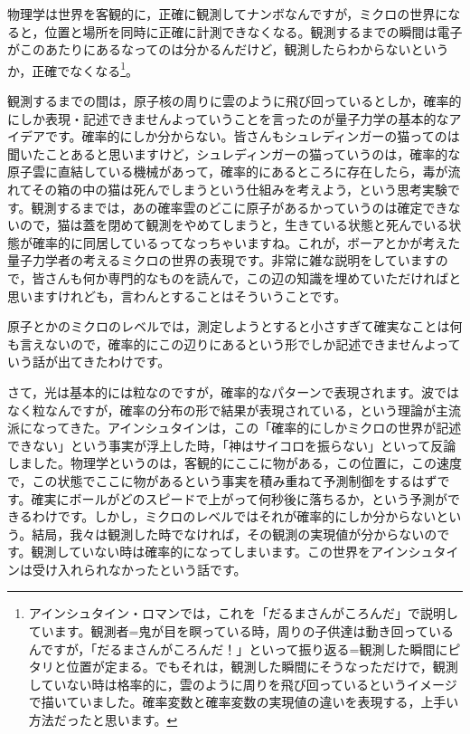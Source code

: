 \documentclass{ltjsbook}
\begin{document}
物理学は世界を客観的に，正確に観測してナンボなんですが，ミクロの世界になると，位置と場所を同時に正確に計測できなくなる。観測するまでの瞬間は電子がこのあたりにあるなってのは分かるんだけど，観測したらわからないというか，正確でなくなる\footnote{アインシュタイン・ロマンでは，これを「だるまさんがころんだ」で説明しています。観測者=鬼が目を瞑っている時，周りの子供達は動き回っているんですが，「だるまさんがころんだ！」といって振り返る=観測した瞬間にピタリと位置が定まる。でもそれは，観測した瞬間にそうなっただけで，観測していない時は格率的に，雲のように周りを飛び回っているというイメージで描いていました。確率変数と確率変数の実現値の違いを表現する，上手い方法だったと思います。}。

観測するまでの間は，原子核の周りに雲のように飛び回っているとしか，確率的にしか表現・記述できませんよっていうことを言ったのが量子力学の基本的なアイデアです。確率的にしか分からない。皆さんもシュレディンガーの猫ってのは聞いたことあると思いますけど，シュレディンガーの猫っていうのは，確率的な原子雲に直結している機械があって，確率的にあるところに存在したら，毒が流れてその箱の中の猫は死んでしまうという仕組みを考えよう，という思考実験です。観測するまでは，あの確率雲のどこに原子があるかっていうのは確定できないので，猫は蓋を閉めて観測をやめてしまうと，生きている状態と死んでいる状態が確率的に同居しているってなっちゃいますね。これが，ボーアとかが考えた量子力学者の考えるミクロの世界の表現です。非常に雑な説明をしていますので，皆さんも何か専門的なものを読んで，この辺の知識を埋めていただければと思いますけれども，言わんとすることはそういうことです。

原子とかのミクロのレベルでは，測定しようとすると小さすぎて確実なことは何も言えないので，確率的にこの辺りにあるという形でしか記述できませんよっていう話が出てきたわけです。

さて，光は基本的には粒なのですが，確率的なパターンで表現されます。波ではなく粒なんですが，確率の分布の形で結果が表現されている，という理論が主流派になってきた。アインシュタインは，この「確率的にしかミクロの世界が記述できない」という事実が浮上した時，「神はサイコロを振らない」といって反論しました。物理学というのは，客観的にここに物がある，この位置に，この速度で，この状態でここに物があるという事実を積み重ねて予測制御をするはずです。確実にボールがどのスピードで上がって何秒後に落ちるか，という予測ができるわけです。しかし，ミクロのレベルではそれが確率的にしか分からないという。結局，我々は観測した時でなければ，その観測の実現値が分からないのです。観測していない時は確率的になってしまいます。この世界をアインシュタインは受け入れられなかったという話です。
\end{document}
